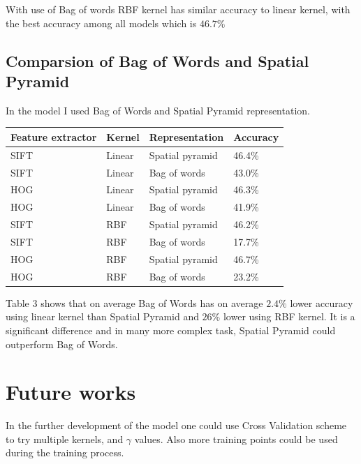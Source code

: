 With use of Bag of words RBF kernel has similar accuracy to linear kernel, with the best accuracy among all  models which is $46.7\%$

    \subsection*{Comparsion of Bag of Words and Spatial Pyramid}
In the model I used Bag of Words and Spatial Pyramid representation.

\begin{tabular}{ |p{3cm}||p{3cm}|p{3cm}|p{3cm}|  }

 \hline
 Feature extractor & Kernel & Representation & Accuracy\\
 \hline \hline
 SIFT   & Linear & Spatial pyramid & 46.4\%\\ \hline 
 SIFT   & Linear & Bag of words & 43.0\%\\ \hline \hline
 HOG &   Linear  & Spatial pyramid & 46.3\%\\ \hline 
 HOG &   Linear  & Bag of words & 41.9\%\\ \hline \hline
 SIFT   & RBF & Spatial pyramid & 46.2\%\\ \hline
 SIFT   & RBF & Bag of words & 17.7\%\\ \hline \hline
 HOG &   RBF  & Spatial pyramid & 46.7\%\\ \hline 
 HOG &   RBF  & Bag of words & 23.2\%\\ \hline
\end{tabular}
\hfill \break
Table 3 shows that on average Bag of Words has on average $2.4\%$ lower accuracy using linear kernel than Spatial Pyramid and $26\%$ lower using RBF kernel. It is a significant difference and in many more complex task, Spatial Pyramid could outperform Bag of Words.

\section*{Future works}
In the further development of the model one could use Cross Validation scheme to try multiple kernels, and $\gamma$ values. Also more training points could be used during the training process.

\begin{figure}[H]
    \printbibliography
\end{figure}

 
